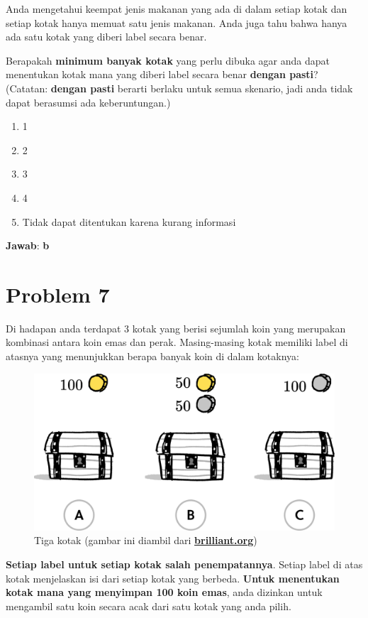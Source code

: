 \documentclass{article}
\theoremstyle{plain}
\begin{document}
\noindent Anda mengetahui keempat jenis makanan yang ada di dalam setiap kotak dan setiap kotak hanya memuat satu jenis makanan. Anda juga tahu bahwa hanya ada satu kotak yang diberi label secara benar.

\bigskip
\noindent Berapakah \textbf{minimum banyak kotak} yang perlu dibuka agar anda dapat menentukan kotak mana yang diberi label secara benar \textbf{dengan pasti}? (Catatan: \textbf{dengan pasti} berarti berlaku untuk semua skenario, jadi anda tidak dapat berasumsi ada keberuntungan.) 

	\begin{enumerate}[-,topsep=0pt, nosep,label=\alph*. ]
		\item 1
		\item 2
		\item 3
		\item 4
		\item Tidak dapat ditentukan karena kurang informasi
	\end{enumerate}

\bigskip
\noindent \textbf{Jawab}: \textbf{b}

\newpage
\section*{Problem 7}
Di hadapan anda terdapat 3 kotak yang berisi sejumlah koin yang merupakan kombinasi antara koin emas dan perak. Masing-masing kotak memiliki label di atasnya yang menunjukkan berapa banyak koin di dalam kotaknya:

\begin{figure}[!ht]
	\centering
	\includegraphics[scale=.12]{images/brilliant}
	\caption{Tiga kotak (gambar ini diambil dari \href{https://brilliant.org}{\textbf{brilliant.org}})}
\end{figure}

\noindent \textbf{Setiap label untuk setiap kotak salah penempatannya}. Setiap label di atas kotak menjelaskan isi dari setiap kotak yang berbeda. \textbf{Untuk menentukan kotak mana yang menyimpan 100 koin emas}, anda dizinkan untuk mengambil satu koin secara acak dari satu kotak yang anda pilih.
\end{document}
